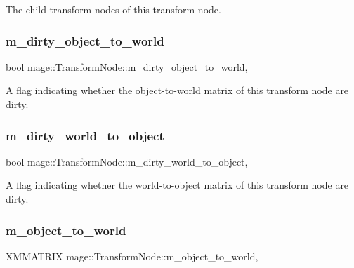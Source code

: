 The child transform nodes of this transform node. \hypertarget{structmage_1_1_transform_node_a389151fddc72499d0be4e725622d99b9}{}\label{structmage_1_1_transform_node_a389151fddc72499d0be4e725622d99b9} 
\subsubsection{\texorpdfstring{m\+\_\+dirty\+\_\+object\+\_\+to\+\_\+world}{m\_dirty\_object\_to\_world}}
{\footnotesize\ttfamily bool mage\+::\+Transform\+Node\+::m\+\_\+dirty\+\_\+object\+\_\+to\+\_\+world\hspace{0.3cm}{\ttfamily [mutable]}, {\ttfamily [private]}}

A flag indicating whether the object-\/to-\/world matrix of this transform node are dirty. \hypertarget{structmage_1_1_transform_node_acb9046e0096ada337e1978f016daa144}{}\label{structmage_1_1_transform_node_acb9046e0096ada337e1978f016daa144} 
\subsubsection{\texorpdfstring{m\+\_\+dirty\+\_\+world\+\_\+to\+\_\+object}{m\_dirty\_world\_to\_object}}
{\footnotesize\ttfamily bool mage\+::\+Transform\+Node\+::m\+\_\+dirty\+\_\+world\+\_\+to\+\_\+object\hspace{0.3cm}{\ttfamily [mutable]}, {\ttfamily [private]}}

A flag indicating whether the world-\/to-\/object matrix of this transform node are dirty. \hypertarget{structmage_1_1_transform_node_a79de447d6d40226d7ceb276007f5fbeb}{}\label{structmage_1_1_transform_node_a79de447d6d40226d7ceb276007f5fbeb} 
\subsubsection{\texorpdfstring{m\+\_\+object\+\_\+to\+\_\+world}{m\_object\_to\_world}}
{\footnotesize\ttfamily X\+M\+M\+A\+T\+R\+IX mage\+::\+Transform\+Node\+::m\+\_\+object\+\_\+to\+\_\+world\hspace{0.3cm}{\ttfamily [mutable]}, {\ttfamily [private]}}

